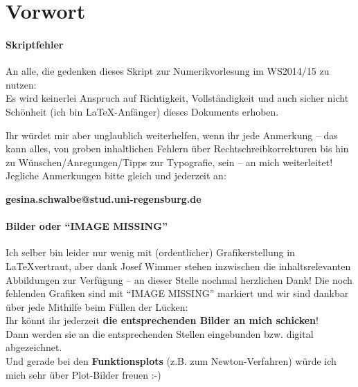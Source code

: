 %
%
%
%


\chapter*{Vorwort}
\subsubsection{Skriptfehler}
An alle, die gedenken dieses Skript zur Numerikvorlesung im WS2014/15 zu 
nutzen: \\
Es wird keinerlei Anspruch auf Richtigkeit, Vollständigkeit und auch sicher nicht Schönheit
(ich bin \LaTeX-Anfänger) dieses Dokuments erhoben.

Ihr würdet mir aber unglaublich weiterhelfen, wenn ihr jede Anmerkung 
-- das kann alles, von groben inhaltlichen 
Fehlern über Rechtschreibkorrekturen bis hin zu Wünschen/Anregungen/Tipps zur Typografie, sein --
an mich weiterleitet!\\

Jegliche Anmerkungen bitte gleich und jederzeit an: \\
\begin{center}
	\textbf{\large
		gesina.schwalbe@stud.uni-regensburg.de}
\end{center}
\hspace{1cm}


\subsubsection{Bilder oder \enquote{IMAGE MISSING}}
Ich selber bin leider nur wenig mit (ordentlicher) Grafikerstellung in \LaTeX vertraut,
aber dank Josef Wimmer stehen inzwischen die inhaltsrelevanten Abbildungen zur Verfügung
-- an dieser Stelle nochmal herzlichen Dank!
Die noch fehlenden Grafiken sind mit \enquote{IMAGE MISSING} markiert und
wir sind dankbar über jede Mithilfe beim Füllen der Lücken:\\
Ihr könnt ihr jederzeit \textbf{die entsprechenden Bilder an mich schicken}!\\
Dann werden sie an die entsprechenden Stellen eingebunden
bzw. digital abgezeichnet. \\
Und gerade bei den \textbf{Funktionsplots} (z.B. zum Newton-Verfahren)
würde ich mich sehr über Plot-Bilder freuen :-)




